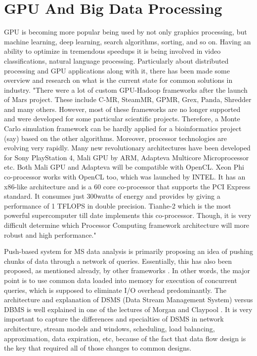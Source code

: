 \documentclass[12pt,letterpaper]{report}
\begin{document}
\section{GPU And Big Data Processing}
\hspace{3em} GPU is becoming more popular being used by not only graphics processing, but machine learning, deep learning, search algorithms, sorting, and so on. Having an ability to optimize in tremendous speedups it is being involved in video classifications, natural language processing. Particularly about distributed processing and GPU applications along with it, there has been made some overview and research on what is the current state for common solutions in industry. "There were a lot of custom GPU-Hadoop frameworks after the launch of Mars project. These include C-MR, SteamMR, GPMR, Grex, Panda, Shredder and many others. However, most of these frameworks are no longer supported and were developed for some particular scientific projects. Therefore, a Monte Carlo simulation framework can be hardly applied for a bioinformatics project (say) based on the other algorithms. Moreover, processor technologies are evolving very rapidly. Many new revolutionary architectures have been developed for Sony PlayStation 4, Mali GPU by ARM, Adapteva Multicore Microprocessor etc. Both Mali GPU and Adapteva will be compatible with OpenCL. Xeon Phi co-processor works with OpenCL too, which was launched by INTEL. It has an x86-like architecture and is a 60 core co-processor that supports the PCI Express standard. It consumes just 300watts of energy and provides by giving a performance of 1 TFLOPS in double precision. Tianhe-2 which is the most powerful supercomputer till date implements this co-processor. Though, it is very difficult determine which Processor Computing framework architecture will more robust and high
performance." \cite{hadoopgpu}

\noindent\hspace{3em}Push-based system for MS data analysis is primarily proposing an idea of pushing chunks of data through a network of queries. Essentially, this has also been proposed, as mentioned already, by other frameworks \cite{DataPath,Volcano,Qpipe}. In other words, the major point is to use common data loaded into memory for execution of concurrent queries, which is supposed to eliminate I/O overhead predominantly. The architecture and explanation of DSMS (Data Stream Management System) versus DBMS is well explained in one of the lectures of Morgan and Claypool \cite{DataStreamManagement}. It is very important to capture the differences and specialties of DSMS in network architecture, stream models and windows, scheduling, load balancing, approximation, data expiration, etc, because of the fact that data flow design is the key that required all of those changes to common designs.
\end{document}
